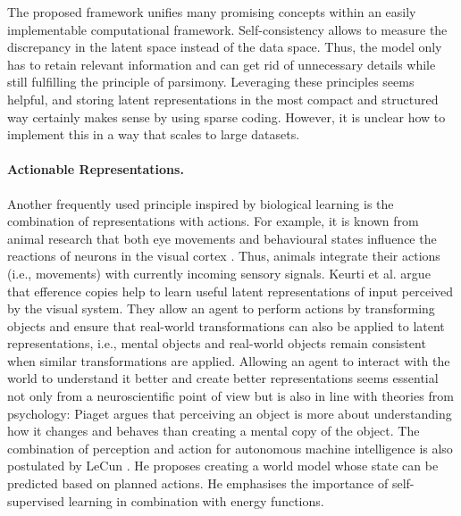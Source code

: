 The proposed framework unifies many promising concepts within an easily implementable computational framework. Self-consistency allows to measure the discrepancy in the latent space instead of the data space. Thus, the model only has to retain relevant information and can get rid of unnecessary details while still fulfilling the principle of parsimony. Leveraging these principles seems helpful, and storing latent representations in the most compact and structured way certainly makes sense by using sparse coding. However, it is unclear how to implement this in a way that scales to large datasets. 

\paragraph{Actionable Representations.} Another frequently used principle inspired by biological learning is the combination of representations with actions. For example, it is known from animal research that both eye movements and behavioural states influence the reactions of neurons in the visual cortex .
Thus, animals integrate their actions (i.e., movements) with currently incoming sensory signals.
Keurti et al.  argue that efference copies help to learn useful latent representations of input perceived by the visual system. They allow an agent to perform actions by transforming objects and ensure that real-world transformations can also be applied to latent representations, i.e., mental objects and real-world objects remain consistent when similar transformations are applied.
Allowing an agent to interact with the world to understand it better and create better representations seems essential not only from a neuroscientific point of view but is also in line with theories from psychology:
Piaget argues that perceiving an object is more about understanding how it changes and behaves than creating a mental copy of the object.
The combination of perception and action for autonomous machine intelligence is also postulated by LeCun . He proposes creating a world model whose state can be predicted based on planned actions. He emphasises the importance of self-supervised learning in combination with energy functions.

